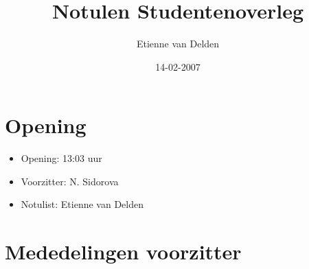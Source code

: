 \documentclass[]{article}
\title{Notulen Studentenoverleg}
\author{Etienne van Delden\\ }
\date{14-02-2007}
\begin{document}
\maketitle

\section{Opening}
  \begin{itemize}
    \item Opening: 13:03 uur
	  \item Voorzitter: N. Sidorova
	  \item Notulist: Etienne van Delden
  \end{itemize}

\section{Mededelingen voorzitter}
\end{document}
